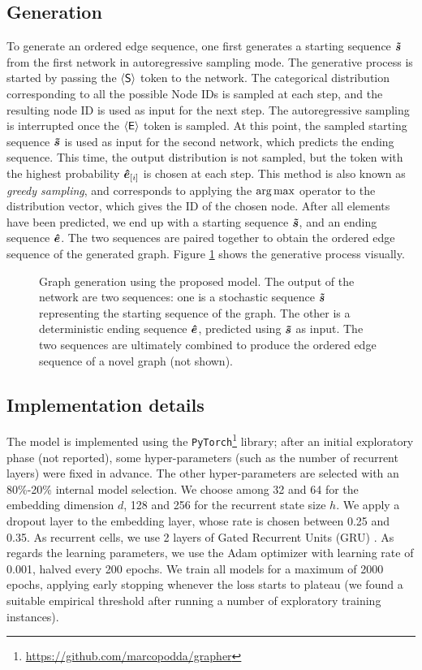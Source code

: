 \subsection{Generation}
To generate an ordered edge sequence, one first generates a starting sequence $\Vector{\tilde{s}}$ from the first network in autoregressive sampling mode. The generative process is started by passing the $\mathsf{\langle S \rangle}$ token to the network. The categorical distribution corresponding to all the possible Node IDs is sampled at each step, and the resulting node ID is used as input for the next step. The autoregressive sampling is interrupted once the $\mathsf{\langle E \rangle}$ token is sampled. At this point, the sampled starting sequence $\Vector{\tilde{s}}$ is used as input for the second network, which predicts the ending sequence. This time, the output distribution is not sampled, but the token with the highest probability $\Elem{\hat{e}}{i}$ is chosen at each step. This method is also known as \emph{greedy sampling}, and corresponds to applying the $\argmax$ operator to the distribution vector, which gives the ID of the chosen node. After all elements have been predicted, we end up with a starting sequence $\Vector{\tilde{s}}$, and an ending sequence $\Vector{\hat{e}}$. The two sequences are paired together to obtain the ordered edge sequence of the generated graph. Figure \ref{fig:model-sampling} shows the generative process visually.
\begin{figure}[h!]
    \centering
    \resizebox{.8\textwidth}{!}{}
    \caption{Graph generation using the proposed model. The output of the network are two sequences: one is a stochastic sequence $\Vector{\tilde{s}}$ representing the starting sequence of the graph. The other is a deterministic ending sequence $\Vector{\hat{e}}$, predicted using $\Vector{\tilde{s}}$ as input. The two sequences are ultimately combined to produce the ordered edge sequence of a novel graph (not shown).}
    \label{fig:model-sampling}
\end{figure}

\subsection{Implementation details}\label{sec:implementation}
The model is implemented using the \texttt{PyTorch}\footnote{\url{https://github.com/marcopodda/grapher}} \cite{paszke2017pytorch} library; after an initial exploratory phase (not reported), some hyper-parameters (such as the number of recurrent layers) were fixed in advance. The other hyper-parameters are selected with an 80\%-20\% internal model selection. We choose among 32 and 64 for the embedding dimension $d$, 128 and 256 for the recurrent state size $h$. We apply a dropout layer to the embedding layer, whose rate is chosen between 0.25 and 0.35. As recurrent cells, we use 2 layers of Gated Recurrent Units (GRU) \cite{cho2014gru}. As regards the learning parameters, we use the Adam \cite{kingma2015adam} optimizer with learning rate of 0.001, halved every 200 epochs. We train all models for a maximum of 2000 epochs, applying early stopping whenever the loss starts to plateau (we found a suitable empirical threshold after running a number of exploratory training instances).

